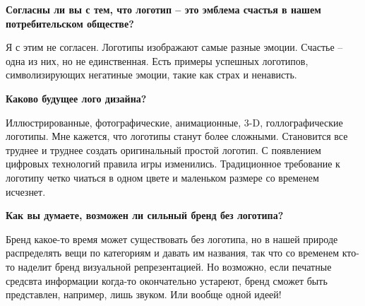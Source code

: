 \textbf{Согласны ли вы с тем, что логотип – это эмблема счастья в нашем потребительском обществе?}

Я с этим не согласен. Логотипы изображают самые разные эмоции. Счастье – одна из них, но не единственная. Есть примеры успешных логотипов, символизирующих негатиные эмоции, такие как страх и ненависть. 

\textbf{Каково будущее лого дизайна?}

Иллюстрированные, фотографические, анимационные, 3-D, голлографические логотипы. Мне кажется, что логотипы станут более сложными. Становится все труднее и труднее создать оригинальный простой логотип. С появлением цифровых технологий правила игры изменились. Традиционное требование к логотипу четко чиаться в одном цвете и маленьком размере со временем исчезнет. 

\textbf{Как вы думаете, возможен ли сильный бренд без логотипа?}

Бренд какое-то время может существовать без логотипа, но в нашей природе распределять вещи по категориям и давать им названия, так что со временем кто-то наделит бренд визуальной репрезентацией. Но возможно, если печатные средсвта информации когда-то окончательно устареют, бренд сможет быть представлен, например, лишь звуком. Или вообще одной идеей!
